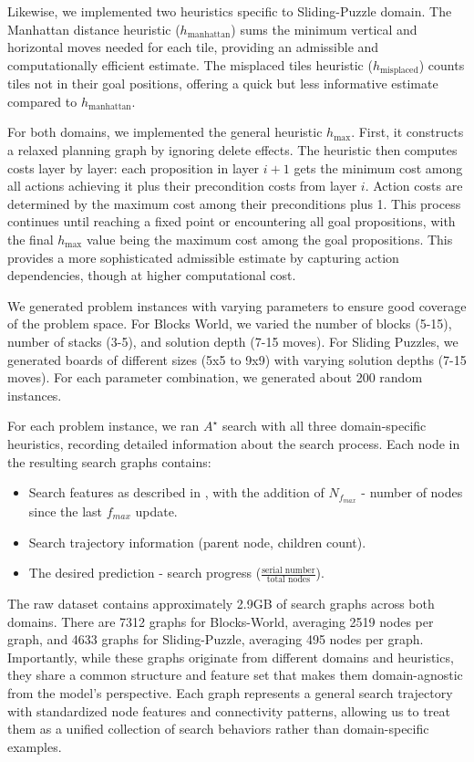 \documentclass[letterpaper]{article}
\begin{document}
Likewise, we implemented two heuristics specific to Sliding-Puzzle domain. The Manhattan distance heuristic ($h_{\text{manhattan}}$) sums the minimum vertical and horizontal moves needed for each tile, providing an admissible and computationally efficient estimate. The misplaced tiles heuristic ($h_{\text{misplaced}}$) counts tiles not in their goal positions, offering a quick but less informative estimate compared to $h_{\text{manhattan}}$.

For both domains, we implemented the general heuristic $h_{\max}$. First, it constructs a relaxed planning graph by ignoring delete effects. The heuristic then computes costs layer by layer: each proposition in layer $i+1$ gets the minimum cost among all actions achieving it plus their precondition costs from layer $i$. Action costs are determined by the maximum cost among their preconditions plus 1. This process continues until reaching a fixed point or encountering all goal propositions, with the final $h_{\max}$ value being the maximum cost among the goal propositions. This provides a more sophisticated admissible estimate by capturing action dependencies, though at higher computational cost.

We generated problem instances with varying parameters to ensure good coverage of the problem space. For Blocks World, we varied the number of blocks (5-15), number of stacks (3-5), and solution depth (7-15 moves). For Sliding Puzzles, we generated boards of different sizes (5x5 to 9x9) with varying solution depths (7-15 moves). For each parameter combination, we generated about 200 random instances.

For each problem instance, we ran $A^{\star}$ search with all three domain-specific heuristics, recording detailed information about the search process. Each node in the resulting search graphs contains:
\begin{itemize}
    \item Search features as described in , with the addition of $N_{f_{max}}$ - number of nodes since the last $f_{max}$ update.
    \item Search trajectory information (parent node, children count).
    \item The desired prediction - search progress ($\frac{\text{serial number}}{\text{total nodes}}$).
\end{itemize}

The raw dataset contains approximately 2.9GB of search graphs across both domains. There are 7312 graphs for Blocks-World, averaging 2519 nodes per graph, and 4633 graphs for Sliding-Puzzle, averaging 495 nodes per graph. Importantly, while these graphs originate from different domains and heuristics, they share a common structure and feature set that makes them domain-agnostic from the model's perspective. Each graph represents a general search trajectory with standardized node features and connectivity patterns, allowing us to treat them as a unified collection of search behaviors rather than domain-specific examples.
\end{document}
